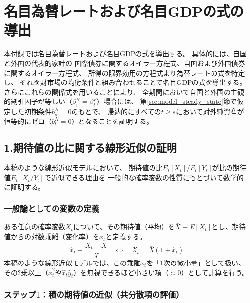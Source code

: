 
\chapter{名目為替レートおよび名目GDPの式の導出}
\label{chap:appendix_exchange_rate_and_gdp}

本付録では名目為替レートおよび名目GDPの式を導出する。
具体的には、自国と外国の代表的家計の
国際債券に関するオイラー方程式、自国および外国債券に関するオイラー方程式、
所得の限界効用の方程式より為替レートの式を特定し、
それを財市場の均衡条件と組み合わせることで名目GDPの式を導出する。
さらにこれらの関係式を用いることにより、
全期間において自国と外国の主観的割引因子が等しい（\(\beta_t^H=\beta_t^F\)）場合には、
第\ref{sec:model_steady_state}節で仮定した初期条件\(b_s^H=0\)のもとで、
帰納的にすべての\(t\ge s\)において対外純資産が恒等的にゼロ（\(b_t^H=0\)）となることを証明する。

\section*{1.期待値の比に関する線形近似の証明}
\label{sec:appendix_exchange_rate_and_gdp_s1}

本稿のような線形近似モデルにおいて、
期待値の比\(E_t[X_t]/E_t[Y_t]\)が比の期待値\(E_t[X_t/Y_t]\)で近似できる理由を
一般的な確率変数の性質にもとづいて数学的に証明する。

\subsection*{一般論としての変数の定義}
\label{sec:appendix_exchange_rate_and_gdp_s1_def}
ある任意の確率変数\(X_t\)について、その期待値（平均）を\(\bar{X}\equiv E[X_t]\)とし、期待値からの対数乖離（変化率）を\(\hat{x}_t\)と定義する。
\begin{equation}
    \hat{x}_t\equiv\frac{X_t-\bar{X}}{\bar{X}}\quad\Longleftrightarrow\quad X_t=\bar{X}(1+\hat{x}_t)
    \label{eq:appendix_exchange_rate_and_gdp_s1_log_linear_def}
\end{equation}
本稿のような線形近似モデルでは、この乖離\(\hat{x}_t\)を「1次の微小量」として扱い、その2乗以上（\(\hat{x}_t^2\)や\(\hat{x}_t\hat{y}_t\)）を無視できるほど小さい項（\(\approx0\)）として計算を行う。

\subsection*{ステップ1：積の期待値の近似（共分散項の評価）}
\label{sec:appendix_exchange_rate_and_gdp_s1_sub1}

